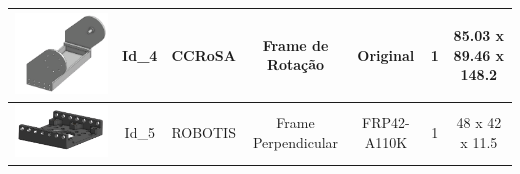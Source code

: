 \documentclass[
12pt,					%
openright,				%
twoside,				%
a4paper,				%
english,
brazil
]{ABNT/abntex2_report}
\begin{document}
\begin{table}[H]
\begin{adjustbox}{max width=\textwidth}
\begin{tabular}{|c|c|c|c|c|c|c|}
		\includegraphics[scale = 0.12]{appendix/frot2.png}      & Id\_4 & CCRoSA         & Frame de Rotação    & Original             & 1          & 85.03 x 89.46 x 148.2 \\ \hline
		\rowcolor[HTML]{EFEFEF} 
		\includegraphics[scale = 0.12]{appendix/ffixper.png} & Id\_5 & ROBOTIS        & Frame Perpendicular & FRP42-A110K          & 1          & 48 x 42 x 11.5        \\ \hline

\end{tabular}
\end{adjustbox}
\end{table}
\end{document}
